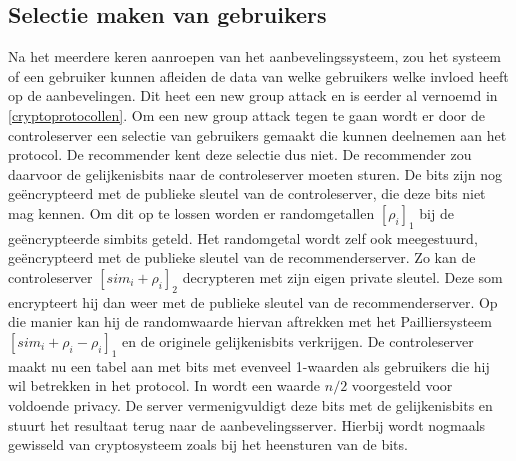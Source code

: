 \subsection{Selectie maken van gebruikers}
\label{selection}
Na het meerdere keren aanroepen van het aanbevelingssysteem, zou het systeem of een gebruiker kunnen afleiden de data van welke gebruikers welke invloed heeft op de aanbevelingen. Dit heet een new group attack en is eerder al vernoemd in \ref{cryptoprotocollen}. Om een new group attack tegen te gaan wordt er door de controleserver een selectie van gebruikers gemaakt die kunnen deelnemen aan het protocol. De recommender kent deze selectie dus niet. De recommender zou daarvoor de gelijkenisbits naar de controleserver moeten sturen. De bits zijn nog ge\"encrypteerd met de publieke sleutel van de controleserver, die deze bits niet mag kennen. Om dit op te lossen worden er randomgetallen $[\rho_i]_1$ bij de ge\"encrypteerde simbits geteld. Het randomgetal wordt zelf ook meegestuurd, ge\"encrypteerd met de publieke sleutel van de recommenderserver. Zo kan de controleserver $[sim_i+\rho_i]_2$ decrypteren met zijn eigen private sleutel. Deze som encrypteert hij dan weer met de publieke sleutel van de recommenderserver. Op die manier kan hij de randomwaarde hiervan aftrekken met het Pailliersysteem $[sim_i+\rho_i-\rho_i]_1$ en de originele gelijkenisbits verkrijgen. De controleserver maakt nu een tabel aan met bits met evenveel 1-waarden als gebruikers die hij wil betrekken in het protocol. In \cite{ZErkinDyn} wordt een waarde $n/2$ voorgesteld voor voldoende privacy. De server vermenigvuldigt deze bits met de gelijkenisbits en stuurt het resultaat terug naar de aanbevelingsserver. Hierbij wordt nogmaals gewisseld van cryptosysteem zoals bij het heensturen van de bits.